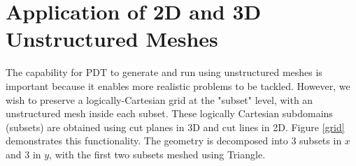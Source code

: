 \documentclass{anstrans}
\begin{document}


\section{Application of 2D and 3D Unstructured Meshes}
\label{ch:motivation}

The capability for PDT to generate and run using unstructured meshes is important because it enables more realistic problems to be tackled. However, we wish to preserve a logically-Cartesian grid at the "subset" level, with an unstructured mesh inside each subset. These logically Cartesian subdomains (subsets) are obtained using cut planes in 3D and cut lines in 2D. Figure \ref{grid} demonstrates this functionality. The geometry is decomposed into 3 subsets in $x$ and 3 in $y$, with the first two subsets meshed using Triangle.
\end{document}
